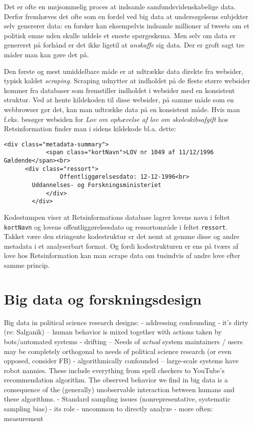\documentclass[12pt,]{article}
\begin{document}
Det er ofte en møjsommelig proces at indsamle samfundsvidenskabelige
data. Derfor fremhæves det ofte som en fordel ved big data at
undersøgelsens subjekter selv genererer data: en forsker kan eksempelvis
indsamle millioner af tweets om et politisk emne uden skulle uddele et
eneste spørgeskema. Men selv om data er genereret på forhånd er det ikke
ligetil at \emph{anskaffe} sig data. Der er groft sagt tre måder man kan
gøre det på.

Den første og mest umiddelbare måde er at udtrække data direkte fra
websider, typisk kaldet \emph{scraping}. Scraping udnytter at indholdet
på de fleste større websider kommer fra databaser som fremstiller
indholdet i websider med en konsistent struktur. Ved at hente kildekoden
til disse websider, på samme måde som en webbrowser gør det, kan man
udtrække data på en konsistent måde. Hvis man f.eks. besøger websiden
for \emph{Lov om ophævelse af lov om skoleskibsafgift} hos
Retsinformation finder man i sidens kildekode bl.a. dette:

\begin{verbatim}
<div class="metadata-summary">
            <span class="kortNavn">LOV nr 1049 af 11/12/1996 Gældende</span><br>
      <div class="ressort">
                Offentliggørelsesdato: 12-12-1996<br>
        Uddannelses- og Forskningsministeriet
            </div>
        </div>
\end{verbatim}

Kodestumpen viser at Retsinformations database lagrer lovens navn i
feltet \texttt{kortNavn} og lovens offentliggørelsesdato og
ressortområde i feltet \texttt{ressort}. Takket være den stringente
kodestruktur er det nemt at gemme disse og andre metadata i et
analyserbart format. Og fordi kodestrukturen er ens på tværs af love hos
Retsinformation kan man scrape data om tusindvis af andre love efter
samme princip.

\hypertarget{big-data-og-forskningsdesign}{%
\section{Big data og
forskningsdesign}\label{big-data-og-forskningsdesign}}

Big data in political science research designs: - addressing confounding
- it's dirty (re: Salganik) -- human behavior is mixed together with
actions taken by bots/automated systems - drifting -- Needs of
\emph{actual} system maintainers / users may be completely orthogonal to
needs of political science research (or even opposed, consider FB) -
algorithmically confounded -- large-scale systems have robot nannies.
These include everything from spell checkers to YouTube's recommendation
algorithm. The observed behavior we find in big data is a consequence of
the (generally) unobservable interaction between humans and these
algorithms. - Standard sampling issues (nonrepresentative, systematic
sampling bias) - its role - uncommon to directly analyze - more often:
measurement
\end{document}
